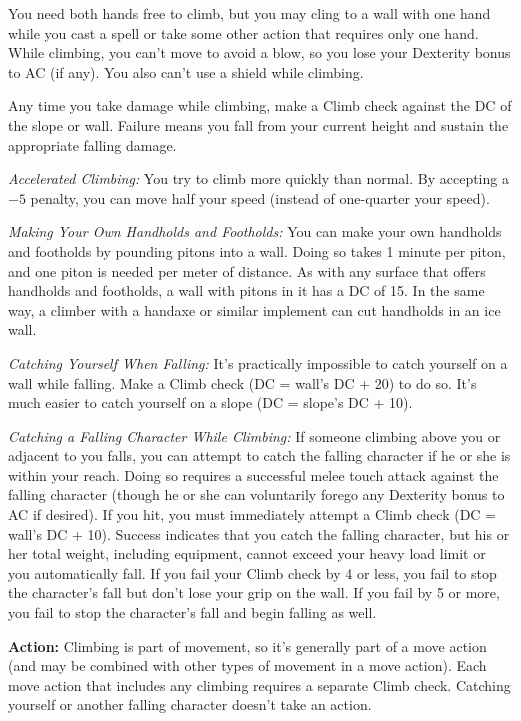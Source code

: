 You need both hands free to climb, but you may cling to a wall with one hand while you cast a spell or take some other action that requires only one hand. While climbing, you can't move to avoid a blow, so you lose your Dexterity bonus to AC (if any). You also can't use a shield while climbing.

Any time you take damage while climbing, make a Climb check against the DC of the slope or wall. Failure means you fall from your current height and sustain the appropriate falling damage.

\textit{Accelerated Climbing:} You try to climb more quickly than normal. By accepting a $-5$ penalty, you can move half your speed (instead of one-quarter your speed).

\textit{Making Your Own Handholds and Footholds:} You can make your own handholds and footholds by pounding pitons into a wall. Doing so takes 1 minute per piton, and one piton is needed per meter of distance. As with any surface that offers handholds and footholds, a wall with pitons in it has a DC of 15. In the same way, a climber with a handaxe or similar implement can cut handholds in an ice wall.

\textit{Catching Yourself When Falling:} It's practically impossible to catch yourself on a wall while falling. Make a Climb check (DC = wall's DC + 20) to do so. It's much easier to catch yourself on a slope (DC = slope's DC + 10).

\textit{Catching a Falling Character While Climbing:} If someone climbing above you or adjacent to you falls, you can attempt to catch the falling character if he or she is within your reach. Doing so requires a successful melee touch attack against the falling character (though he or she can voluntarily forego any Dexterity bonus to AC if desired). If you hit, you must immediately attempt a Climb check (DC = wall's DC + 10). Success indicates that you catch the falling character, but his or her total weight, including equipment, cannot exceed your heavy load limit or you automatically fall. If you fail your Climb check by 4 or less, you fail to stop the character's fall but don't lose your grip on the wall. If you fail by 5 or more, you fail to stop the character's fall and begin falling as well.

\textbf{Action:} Climbing is part of movement, so it's generally part of a move action (and may be combined with other types of movement in a move action). Each move action that includes any climbing requires a separate Climb check. Catching yourself or another falling character doesn't take an action.

